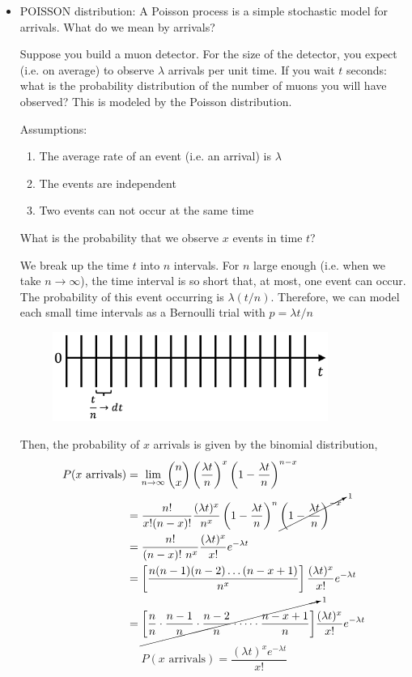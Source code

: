 \documentclass[12pt]{article}
\numberwithin{equation}{section}
\begin{document}
\begin{itemize}
\item POISSON distribution: A Poisson process is a simple stochastic model for arrivals. What do we mean by arrivals?

Suppose you build a muon detector. For the size of the detector, you expect (i.e. on average) to observe $ \lambda $ arrivals per unit time. If you wait $ t $ seconds: what is the probability distribution of the number of muons you will have observed? This is modeled by the Poisson distribution.

Assumptions:
\begin{enumerate}
	\item The average rate of an event (i.e. an arrival) is $ \lambda $
	\item The events are independent
	\item Two events can not occur at the same time
\end{enumerate}

What is the probability that we observe $ x $ events in time $ t $?

We break up the time $ t $ into $ n $ intervals. For $ n $ large enough (i.e. when we take $ n\to\infty $), the time interval is so short that, at most, one event can occur. The probability of this event occurring is $ \lambda (t/n) $. Therefore, we can model each small time intervals as a Bernoulli trial with $ p=\lambda t/n $ 

\begin{figure}[H]
	\centering
	\includegraphics[width=9cm] {poi}
\end{figure}

Then, the probability of $ x $ arrivals is given by the binomial distribution, 
\begin{align}
		P(x \text{ arrivals}) &= \lim_{n\to\infty} {n \choose x} \left(\frac{\lambda t}{n}\right)^x \left(1-\frac{\lambda t}{n}\right)^{n-x}\\
		&= \frac{n!}{x!(n-x)!}\frac{(\lambda t)^x}{n^x}\left(1-\frac{\lambda t}{n}\right)^{n} \cancelto{_1}{\left(1-\frac{\lambda t}{n}\right)^{-x}}\\
		&= \frac{n!}{(n-x)!\ n^x}\frac{(\lambda t)^x}{x!} e^{-\lambda t} \\
		&= \left[\frac{n(n-1)(n-2)\dots (n-x+1)}{n^x}\right]\frac{(\lambda t)^x}{x!}  e^{-\lambda t}\\
		&= \cancelto{_1}{\left[ \frac{n}{n} \cdot \frac{n-1}{n} \cdot \frac{n-2}{n} \cdot \dots \cdot \frac{n-x+1}{n} \right]}\frac{(\lambda t)^x}{x!}  e^{-\lambda t}\\
\end{align}
\begin{equation}
		P(x \text{ arrivals}) = \frac{(\lambda t)^x  e^{-\lambda t}}{x!}
\end{equation}


\end{itemize}
\end{document}
